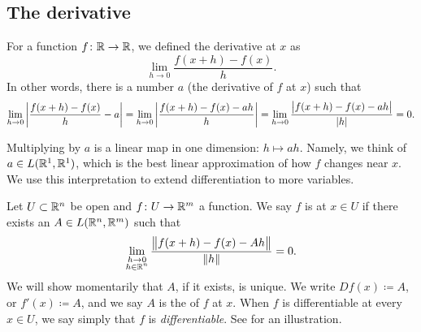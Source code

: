 

\subsection{The derivative}

For a function $f \colon {\mathbb{R}} \to {\mathbb{R}}$, we defined
the derivative at $x$ as
\begin{equation*}
\lim_{h \to 0} \frac{f(x+h)-f(x)}{h} .
\end{equation*}
In other words, there is a number $a$ (the derivative of $f$ at $x$) such that
\begin{equation*}
\lim_{h \to 0} \left\lvert {\frac{f(x+h)-f(x)}{h} - a} \right\rvert
=
\lim_{h \to 0} \left\lvert {\frac{f(x+h)-f(x) - ah}{h}} \right\rvert
=
\lim_{h \to 0} \frac{\bigl\lvert {f(x+h)-f(x) - ah} \bigr\rvert}{\lvert {h} \rvert}
= 0.
\end{equation*}

Multiplying by $a$ is a linear map in one dimension:
$h \mapsto ah$.
Namely,
we think of $a \in L({\mathbb{R}}^1,{\mathbb{R}}^1)$, 
which is the best linear approximation of
how $f$ changes near $x$.  We use this interpretation
to extend differentiation to more variables.

\begin{defn}
Let $U \subset {\mathbb{R}}^n$ be open and $f \colon U \to {\mathbb{R}}^m$ a function.  We
say $f$ is \emph{} at $x \in U$ if there exists
an $A \in L({\mathbb{R}}^n,{\mathbb{R}}^m)$ such that
\begin{equation*}
\lim_{\substack{h \to 0\\h\in {\mathbb{R}}^n}}
\frac{\bigl\lVert {f(x+h)-f(x) - Ah} \bigr\rVert}{\lVert {h} \rVert} = 0 .
\end{equation*}
We will show momentarily that $A$, if it exists, is unique.
We write $Df(x) \coloneqq A$, or $f'(x) \coloneqq A$, and
we say $A$ is the \emph{} of $f$ at $x$.
When $f$ is differentiable at
every $x \in U$, we say simply that $f$ is \emph{differentiable}.  See
 for an illustration.
\end{defn}

\begin{myfigureht}
\caption{Illustration of a derivative for a function $f \colon \R^2 \to \R$.  The vector $h$ is shown
in the $x_1x_2$-plane based at $(x_1,x_2)$, and the vector
$Ah \in \R^1$ is shown along the $y$ direction.\label{fig:svder}}
\end{myfigureht}

